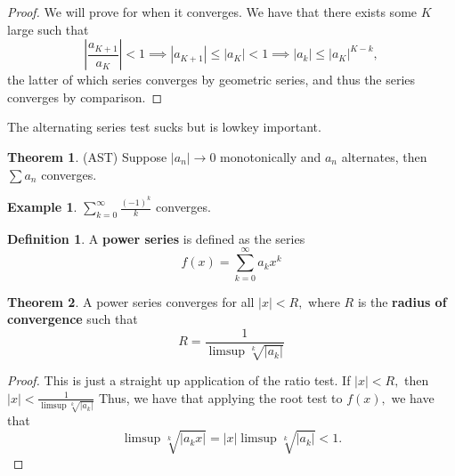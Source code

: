 \documentclass[10pt, oneside]{article}
\theoremstyle{definition}
\newtheorem{exmp}{Example}[section]
\newtheorem{thm}{Theorem}
\newtheorem{defn}{Definition}
\begin{document}
\begin{proof}
    We will prove for when it converges. We have that there exists some $K$ large such that
    \[\left|\frac{a_{K+1}}{a_K}\right|<1\implies |a_{K+1}|\leq |a_K|<1 \implies |a_k| \leq |a_K|^{K-k},\] the latter of which series converges by geometric series, and thus the series converges by comparison.
\end{proof}
The alternating series test sucks but is lowkey important.
\begin{thm}
    (AST) Suppose $|a_n| \to 0$ monotonically and $a_n$ alternates, then $\sum a_n$ converges.
\end{thm}
\begin{exmp}
    $\sum_{k=0}^\infty \frac{(-1)^k}{k}$ converges.
\end{exmp}
\begin{defn}
    A \textbf{power series} is defined as the series
    \[f(x) = \sum_{k=0}^\infty a_kx^k\]
\end{defn}
\begin{thm}
    A power series converges for all $|x| <R,$ where $R$ is the \textbf{radius of convergence} such that 
    \[R  = \frac{1}{\limsup \sqrt[k]{|a_k|}}\]
\end{thm}
\begin{proof}
    This is just a straight up application of the ratio test. If $|x|< R,$ then $|x|< \frac{1}{\limsup \sqrt[k]{|a_k|}}$ Thus, we have that applying the root test to $f(x),$ we have that 
    \[\limsup \sqrt[k]{|a_kx|} = |x|\limsup \sqrt[k]{|a_k|} <1.\]
\end{proof}


\newpage
\end{document}
